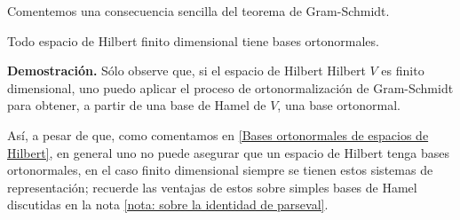 
\QEDB
\vspace{0.2cm}

Comentemos una consecuencia sencilla del teorema
de Gram-Schmidt. 

\begin{cor}
Todo espacio de Hilbert finito dimensional tiene 
bases ortonormales.
\end{cor}
\noindent
\textbf{Demostración.}
Sólo observe que, si el espacio de Hilbert
Hilbert $V$ es finito dimensional, uno puedo aplicar
el proceso de ortonormalización de Gram-Schmidt para
obtener, a partir de una base de Hamel de $V$,
una base ortonormal. 
\QEDB
\vspace{0.2cm}

Así, a pesar de que, como comentamos en 
\ref{Bases ortonormales de espacios de Hilbert}, 
en general uno no puede asegurar que un espacio de 
Hilbert tenga bases ortonormales, en el caso finito dimensional
siempre se tienen estos sistemas de representación;
 recuerde las ventajas
de estos sobre simples bases de Hamel discutidas
en la nota \ref{nota: sobre la identidad de parseval}.



